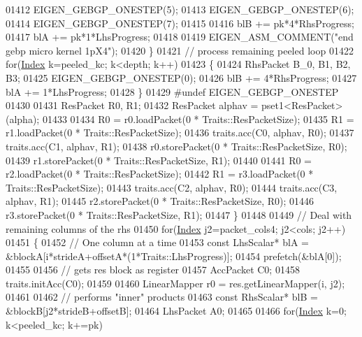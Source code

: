 \begin{DoxyCode}
01412             EIGEN\_GEBGP\_ONESTEP(5);
01413             EIGEN\_GEBGP\_ONESTEP(6);
01414             EIGEN\_GEBGP\_ONESTEP(7);
01415 
01416             blB += pk*4*RhsProgress;
01417             blA += pk*1*LhsProgress;
01418 
01419             EIGEN\_ASM\_COMMENT(\textcolor{stringliteral}{"end gebp micro kernel 1pX4"});
01420           \}
01421           \textcolor{comment}{// process remaining peeled loop}
01422           \textcolor{keywordflow}{for}(\hyperlink{namespace_eigen_a62e77e0933482dafde8fe197d9a2cfde}{Index} k=peeled\_kc; k<depth; k++)
01423           \{
01424             RhsPacket B\_0, B1, B2, B3;
01425             EIGEN\_GEBGP\_ONESTEP(0);
01426             blB += 4*RhsProgress;
01427             blA += 1*LhsProgress;
01428           \}
01429 \textcolor{preprocessor}{#undef EIGEN\_GEBGP\_ONESTEP}
01430 
01431           ResPacket R0, R1;
01432           ResPacket alphav = pset1<ResPacket>(alpha);
01433 
01434           R0 = r0.loadPacket(0 * Traits::ResPacketSize);
01435           R1 = r1.loadPacket(0 * Traits::ResPacketSize);
01436           traits.acc(C0, alphav, R0);
01437           traits.acc(C1,  alphav, R1);
01438           r0.storePacket(0 * Traits::ResPacketSize, R0);
01439           r1.storePacket(0 * Traits::ResPacketSize, R1);
01440 
01441           R0 = r2.loadPacket(0 * Traits::ResPacketSize);
01442           R1 = r3.loadPacket(0 * Traits::ResPacketSize);
01443           traits.acc(C2,  alphav, R0);
01444           traits.acc(C3,  alphav, R1);
01445           r2.storePacket(0 * Traits::ResPacketSize, R0);
01446           r3.storePacket(0 * Traits::ResPacketSize, R1);
01447         \}
01448 
01449         \textcolor{comment}{// Deal with remaining columns of the rhs}
01450         \textcolor{keywordflow}{for}(\hyperlink{namespace_eigen_a62e77e0933482dafde8fe197d9a2cfde}{Index} j2=packet\_cols4; j2<cols; j2++)
01451         \{
01452           \textcolor{comment}{// One column at a time}
01453           \textcolor{keyword}{const} LhsScalar* blA = &blockA[i*strideA+offsetA*(1*Traits::LhsProgress)];
01454           prefetch(&blA[0]);
01455 
01456           \textcolor{comment}{// gets res block as register}
01457           AccPacket C0;
01458           traits.initAcc(C0);
01459 
01460           LinearMapper r0 = res.getLinearMapper(i, j2);
01461 
01462           \textcolor{comment}{// performs "inner" products}
01463           \textcolor{keyword}{const} RhsScalar* blB = &blockB[j2*strideB+offsetB];
01464           LhsPacket A0;
01465 
01466           \textcolor{keywordflow}{for}(\hyperlink{namespace_eigen_a62e77e0933482dafde8fe197d9a2cfde}{Index} k=0; k<peeled\_kc; k+=pk)

\end{DoxyCode}
